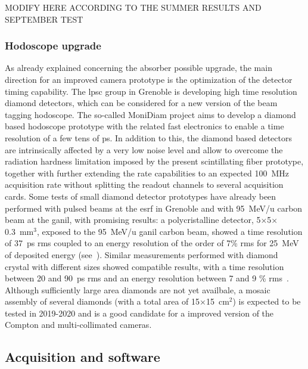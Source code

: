 MODIFY HERE ACCORDING TO THE SUMMER RESULTS AND SEPTEMBER TEST       

\subsubsection{Hodoscope upgrade}\label{chap3::subsubsec::hodoUpgrade} 

As already explained concerning the absorber possible upgrade, the main direction for an improved camera prototype is the optimization of the detector timing capability. The \gls{lpsc} group in Grenoble is developing high time resolution diamond detectors, which can be considered for a new version of the beam tagging hodoscope. The so-called MoniDiam project aims to develop a diamond based hodoscope prototype with the related fast electronics to enable a time resolution of a few tens of ps. In addition to this, the diamond based detectors are intrinsically affected by a very low noise level and allow to overcome the radiation hardness limitation imposed by the present scintillating fiber prototype, together with further extending the rate capabilities to an expected 100~MHz acquisition rate without splitting the readout channels to several acquisition cards. Some tests of small diamond detector prototypes have already been performed with pulsed beams at the \gls{esrf} in Grenoble and with 95~MeV/u carbon beam at the \gls{ganil}, with promising results: a polycristalline detector, 5$\times$5$\times$0.3~mm$^3$, exposed to the 95~MeV/u \gls{ganil} carbon beam, showed a time resolution of 37~ps \gls{rms} coupled to an energy resolution of the order of 7\% \gls{rms} for 25~MeV of deposited energy (see~\cite{Gallin-Martel2016}). Similar measurements performed with diamond crystal with different sizes showed compatible results, with a time resolution between 20 and 90~ps \gls{rms} and an energy resolution between 7 and 9 \% \gls{rms}~\parencite{Gallin-Martel2018}. Although sufficiently large area diamonds are not yet availbale, a mosaic assembly of several diamonds (with a total area of 15$\times$15~cm$^{2}$) is expected to be tested in 2019-2020 and is a good candidate for a improved version of the Compton and multi-collimated cameras.

\subsection{Acquisition and software}\label{chap3::subsec::daqNext}


